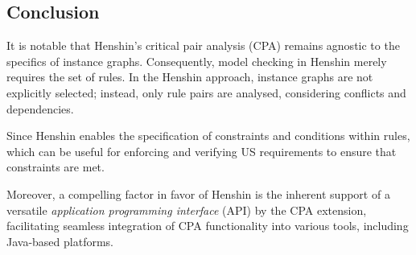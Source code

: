 \subsection*{Conclusion}\label{henshin_groove_conclusion}
It is notable that Henshin's critical pair analysis (CPA) remains agnostic to the specifics of instance graphs. Consequently, model checking in Henshin merely requires the set of rules. In the Henshin approach, instance graphs are not explicitly selected; instead, only rule pairs are analysed, considering conflicts and dependencies.

Since Henshin enables the specification of constraints and conditions within rules, which can be useful for enforcing and verifying US requirements to ensure that constraints are met.

Moreover, a compelling factor in favor of Henshin is the inherent support of a versatile \emph{application programming interface} (API) by the CPA extension, facilitating seamless integration of CPA functionality into various tools, including Java-based platforms.


